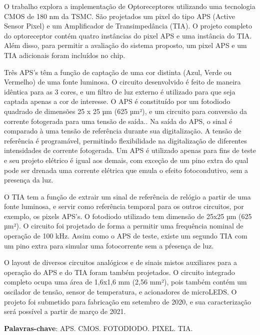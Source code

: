 
\setlength{\absparsep}{18pt} %
\begin{resumo}

O trabalho explora a implementação de Optoreceptores utilizando uma tecnologia CMOS de 180 nm da TSMC. São projetados um pixel do tipo APS (Active Sensor Pixel) e
um Amplificador de Transimpedância (TIA). O projeto completo do optoreceptor contém quatro instâncias do pixel APS e uma instância do TIA. Além disso, para permitir a avaliação do sistema proposto, um pixel APS e um TIA adicionais foram incluídos no chip.

Três APS’s t\^em a função de captação de uma cor distinta (Azul, Verde ou Vermelho) de uma fonte luminosa. O circuito desenvolvido é feito de maneira idêntica para as 3 cores, e um filtro de luz externo é utilizado para que seja captada apenas a cor de interesse. O APS é constituído por um fotodiodo quadrado de dimensões 25 x 25 µm (625 µm²), e um
circuito para conversão da corrente fotogerada para uma tensão de saída.. Na saída do APS, o sinal é comparado à uma tensão de referência durante sua digitalização. A tensão de referência é programável, permitindo flexibilidade na digitalização de diferentes intensidades de corrente fotogerada. Um APS é utilizado apenas para fins de teste e seu projeto elétrico é igual aos demais, com exceção de um pino extra do qual pode ser drenada uma corrente elétrica que emula o efeito fotocondutivo, sem a presença da luz.

O TIA tem a função de extrair um sinal de referência de relógio a partir de uma fonte luminosa, e servir como referência temporal para os outros circuitos, por exemplo, os pixels APS’s. O fotodiodo utilizado tem dimensão de 25x25 µm (625 µm²). O circuito foi projetado de forma a permitir uma frequência nominal de operação de 100 kHz. Assim como o APS de teste, existe um segundo TIA com um pino extra para simular uma fotocorrente sem a pŕesença de luz.

O layout de diversos circuitos analógicos e de sinais mistos auxiliares para a operação do APS e do TIA foram também projetados. O circuito integrado completo ocupa uma área de 1,6x1,6 mm (2,56 mm²), pois também contém um oscilador de tensão, sensor de temperatura, e acionadores de microLEDS. O projeto foi submetido para fabricação em setembro de 2020, e sua caracterização será possível a partir de março de 2021.


 \textbf{Palavras-chave}: APS. CMOS. FOTODIODO. PIXEL. TIA.
\end{resumo}